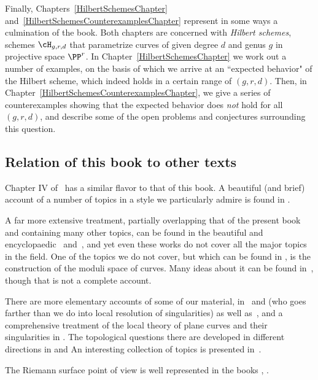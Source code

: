  Finally, Chapters~\ref{HilbertSchemesChapter} and~\ref{HilbertSchemesCounterexamplesChapter} represent in some ways a culmination of the book. Both chapters are concerned with \emph{Hilbert schemes}, schemes $\cH_{g,r,d}$ that parametrize curves of given degree $d$ and genus $g$ in projective space $\PP^r$. In Chapter~\ref{HilbertSchemesChapter} we work out a number of examples, on the basis of which we arrive at an ``expected behavior" of the Hilbert scheme, which indeed holds in a certain range of $(g,r,d)$. Then, in Chapter~\ref{HilbertSchemesCounterexamplesChapter}, we give a series of counterexamples showing that the expected behavior does \emph{not} hold for all $(g,r,d)$, and describe some of the open problems and conjectures surrounding this question.



\subsection{Relation of this book to other texts} 
Chapter IV of~\cite{Hartshorne1977} has a similar flavor to that of this book. A beautiful (and brief) account of a number of topics in a style we particularly admire is found in \cite{MumfordCJ}.

A far more extensive treatment, partially overlapping that of the present book and containing many other topics, can be found in the beautiful and encyclopaedic~\cite{ACGH} and~\cite{ACG}, and yet even these works do not cover all the major topics in the field. 
One of the topics we do not cover, but which can be found in \cite{ACG}, is the construction of the moduli space of curves. Many  ideas  about it can be found in~\cite{HarrisMorrison1998}, though  that is not a complete account. 

There are more elementary accounts of some of our material, in~\cite{Fulton1989} and \cite{Walker1978} (who goes farther than we do into local resolution of singularities) as well as~\cite{Griffiths-curves}, and a comprehensive treatment of the local theory of plane curves and their singularities in \cite{Brieskorn1986}. The topological questions there are developed in different directions in \cite{MR0239612} %
 and \cite{MR817982}%
 An interesting collection of topics is presented in~\cite{Clemens-Scrapbook}.

 The Riemann surface point of view is well represented in the books \cite{Forster} \cite{Gunning}, \cite{Gunning-2} \cite{Kirwan}\cite{Miranda}. 


